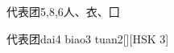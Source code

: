 \begin{entry}{代表团}{5,8,6}{⼈、⾐、⼞}
  \begin{phonetics}{代表团}{dai4 biao3 tuan2}[][HSK 3]
  \end{phonetics}
\end{entry}
